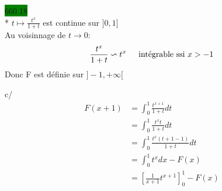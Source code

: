 \documentclass{article}
\begin{document}
\noindent \colorbox{green}{660.18}\\ 
* \(t \mapsto \frac{t^{x}}{1+t}\) est continue sur \(]0, 1]\)\\ 
Au voisinnage de \(t \to 0\): 
\begin{align*}
  \frac{t^{x}}{1+t} \backsim t^{x} \indent \text{intégrable ssi } x> -1 
\end{align*}
Donc F est définie sur \(]-1, +\infty[\)

\noindent c/ 
\begin{align*}
  F(x+1) &= \int_{0}^{1}\frac{t^{x+1}}{1+t}dt \\ 
         &= \int_{0}^{1}\frac{t^{x}t}{1+t}dt \\ 
         &= \int_{0}^{1} \frac{t^{x}(t+1-1)}{1+t}dt \\ 
         &= \int_{0}^{1}t^{x}dx - F(x)\\ 
         &= [\frac{1}{x+1}t^{x+1}]^{1}_{0} - F(x)
\end{align*}
\end{document}
